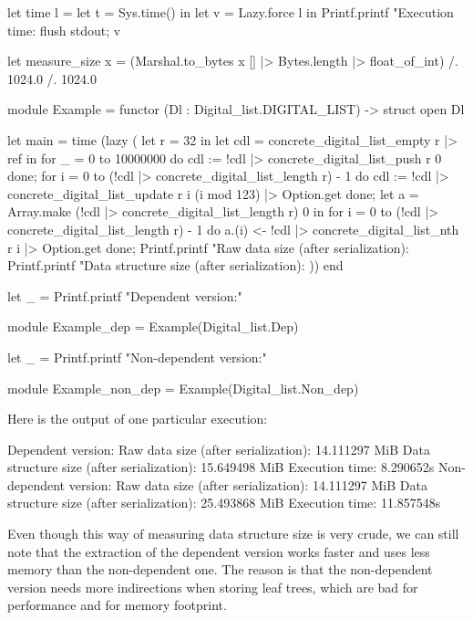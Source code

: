 \documentclass{article}
\begin{document}
\begin{coq}
let time l =
  let t = Sys.time() in
  let v = Lazy.force l in
  Printf.printf "Execution time: %
  flush stdout;
  v

let measure_size x = (Marshal.to_bytes x [] |> Bytes.length |> float_of_int) /. 1024.0 /. 1024.0

module Example = functor (Dl : Digital_list.DIGITAL_LIST) -> struct
  open Dl

  let main =
    time (lazy (
      let r = 32 in
      let cdl = concrete_digital_list_empty r |> ref in
      for _ = 0 to 10000000 do
        cdl := !cdl |> concrete_digital_list_push r 0
      done;
      for i = 0 to (!cdl |> concrete_digital_list_length r) - 1 do
        cdl := !cdl |> concrete_digital_list_update r i (i mod 123) |> Option.get
      done;
      let a = Array.make (!cdl |> concrete_digital_list_length r) 0 in
      for i = 0 to (!cdl |> concrete_digital_list_length r) - 1 do
        a.(i) <- !cdl |> concrete_digital_list_nth r i |> Option.get
      done;
      Printf.printf "Raw data size (after serialization): %
      Printf.printf "Data structure size (after serialization): %
    ))
end

let _ = Printf.printf "Dependent version:\n"

module Example_dep = Example(Digital_list.Dep)

let _ = Printf.printf "Non-dependent version:\n"

module Example_non_dep = Example(Digital_list.Non_dep)
\end{coq}

Here is the output of one particular execution:

\begin{coq}
Dependent version:
Raw data size (after serialization): 14.111297 MiB
Data structure size (after serialization): 15.649498 MiB
Execution time: 8.290652s
Non-dependent version:
Raw data size (after serialization): 14.111297 MiB
Data structure size (after serialization): 25.493868 MiB
Execution time: 11.857548s
\end{coq}

Even though this way of measuring data structure size is very crude, we can still note that the extraction of the dependent version works faster and uses less memory than the non-dependent one. The reason is that the non-dependent version needs more indirections when storing leaf trees, which are bad for performance and for memory footprint.
\end{document}
